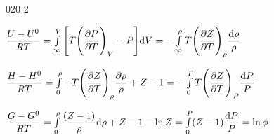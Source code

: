 \begin{mitframe}{020-2} 

    
	\begin{listone}

	\item $\dfrac{\intenergy-\intenergy^{\init}}{\gasconst\Temp}=\int\limits_{\infty}^{\vol}\Bigg[\Temp\Bigg(\dfrac{\partial\p}{\partial\Temp}\Bigg)_{\vol}-\p\Bigg]\mathrm{d}\vol=-\int\limits_{\infty}^{\dens}\Temp\Bigg(\dfrac{\partial\compress}{\partial\Temp}\Bigg)_{\dens}\dfrac{\mathrm{d}\dens}{\dens}$
    
    \item $\dfrac{\enthalpy-\enthalpy^{\init}}{\gasconst\Temp}=\int\limits_{0}^{\dens}-\Temp\Bigg(\dfrac{\partial\compress}{\partial\Temp}\Bigg)_{\dens}\dfrac{\partial\dens}{\dens}+\compress-1=-\int\limits_{0}^{\p}\Temp\Bigg(\dfrac{\partial\compress}{\partial\Temp}\Bigg)_{\p}\dfrac{\mathrm{d}\p}{\p}$
    
    \item $\dfrac{\gibbs-\gibbs^{\init}}{\gasconst\Temp}=\int\limits_{0}^{\dens}\dfrac{(\compress-1)}{\dens}\mathrm{d}\dens+\compress-1-\ln\compress=\int\limits_{0}^{\p}(\compress-1)\dfrac{\mathrm{d}\p}{\p}=\ln\fugcoeff$

	\end{listone}			

\end{mitframe}